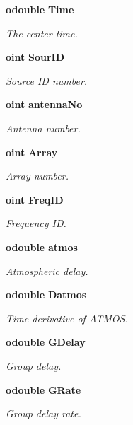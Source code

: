 \begin{CompactItemize}
{\bf odouble} {\bf Time}
\begin{CompactList}\small\item\em The center time. \item\end{CompactList}\item 
{\bf oint} {\bf Sour\-ID}
\begin{CompactList}\small\item\em Source ID number. \item\end{CompactList}\item 
{\bf oint} {\bf antenna\-No}
\begin{CompactList}\small\item\em Antenna number. \item\end{CompactList}\item 
{\bf oint} {\bf Array}
\begin{CompactList}\small\item\em Array number. \item\end{CompactList}\item 
{\bf oint} {\bf Freq\-ID}
\begin{CompactList}\small\item\em Frequency ID. \item\end{CompactList}\item 
{\bf odouble} {\bf atmos}
\begin{CompactList}\small\item\em Atmospheric delay. \item\end{CompactList}\item 
{\bf odouble} {\bf Datmos}
\begin{CompactList}\small\item\em Time derivative of ATMOS. \item\end{CompactList}\item 
{\bf odouble} {\bf GDelay}
\begin{CompactList}\small\item\em Group delay. \item\end{CompactList}\item 
{\bf odouble} {\bf GRate}
\begin{CompactList}\small\item\em Group delay rate. \item\end{CompactList}\item 

\end{CompactItemize}
